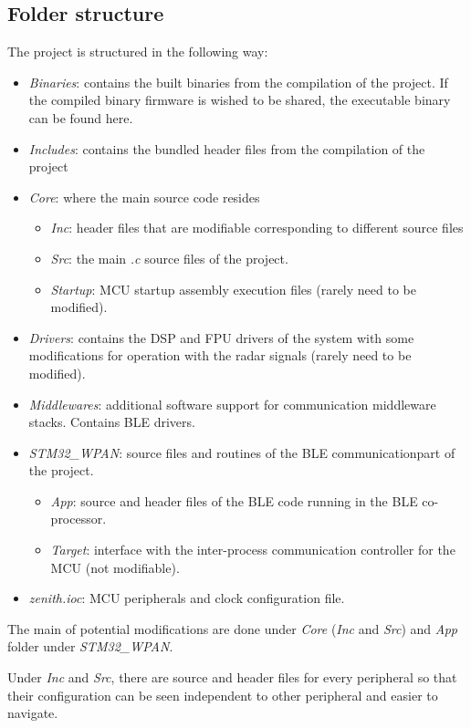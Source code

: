 \subsection{Folder structure}

The project is structured in the following way:
\begin{itemize}
	\item \textit{Binaries}: contains the built binaries from the compilation of the project. If the compiled binary firmware is wished to be shared, the executable binary can be found here.
	\item \textit{Includes}: contains the bundled header files from the compilation of the project
	\item \textit{Core}: where the main source code resides
	\begin{itemize}
		\item \textit{Inc}: header files that are modifiable corresponding to different source files
		\item \textit{Src}: the main \textit{.c} source files of the project.
		\item \textit{Startup}: MCU startup assembly execution files (rarely need to be modified).
	\end{itemize}
	\item \textit{Drivers}: contains the DSP and FPU drivers of the system with some modifications for operation with the radar signals (rarely need to be modified).
	\item \textit{Middlewares}: additional software support for communication middleware stacks. Contains BLE drivers.
	\item  \textit{STM32\_WPAN}: source files and routines of the BLE communicationpart of the project.
	\begin{itemize}
		\item \textit{App}: source and header files of the BLE code running in the BLE co-processor.
		\item \textit{Target}: interface with the inter-process communication controller for the MCU (not modifiable).
	\end{itemize}
	\item \textit{zenith.ioc}: MCU peripherals and clock configuration file.
\end{itemize}

The main of potential modifications are done under \textit{Core} (\textit{Inc} and \textit{Src}) and \textit{App} folder under \textit{STM32\_WPAN}.

Under \textit{Inc} and \textit{Src}, there are source and header files for every peripheral so that their configuration can be seen independent to other peripheral and easier to navigate.


